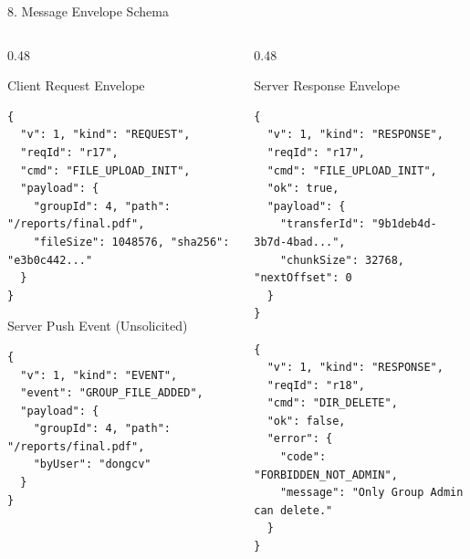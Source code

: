 \documentclass[t, aspectratio=169]{beamer}
\begin{document}
\begin{frame}[fragile]{8. Message Envelope Schema}
\small
\begin{columns}[T]
\begin{column}{0.48\textwidth}
\begin{block}{Client Request Envelope}
\tiny
\begin{verbatim}
{
  "v": 1, "kind": "REQUEST",
  "reqId": "r17",
  "cmd": "FILE_UPLOAD_INIT",
  "payload": {
    "groupId": 4, "path": "/reports/final.pdf",
    "fileSize": 1048576, "sha256": "e3b0c442..."
  }
}
\end{verbatim}
\end{block}
\vspace{-8pt}
\begin{block}{Server Push Event (Unsolicited)}
\tiny
\begin{verbatim}
{
  "v": 1, "kind": "EVENT",
  "event": "GROUP_FILE_ADDED",
  "payload": {
    "groupId": 4, "path": "/reports/final.pdf",
    "byUser": "dongcv"
  }
}
\end{verbatim}
\end{block}
\end{column}

\begin{column}{0.48\textwidth}
\begin{block}{Server Response Envelope}
\tiny
\begin{verbatim}
{
  "v": 1, "kind": "RESPONSE",
  "reqId": "r17",
  "cmd": "FILE_UPLOAD_INIT",
  "ok": true,
  "payload": {
    "transferId": "9b1deb4d-3b7d-4bad...",
    "chunkSize": 32768, "nextOffset": 0
  }
}

{
  "v": 1, "kind": "RESPONSE",
  "reqId": "r18",
  "cmd": "DIR_DELETE",
  "ok": false,
  "error": {
    "code": "FORBIDDEN_NOT_ADMIN",
    "message": "Only Group Admin can delete."
  }
}
\end{verbatim}
\end{block}
\end{column}
\end{columns}
\end{frame}
\end{document}
